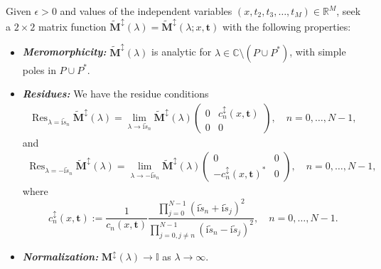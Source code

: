 \documentclass[12pt]{amsart}
\numberwithin{equation}{section}
\newcommand{\ii}{\mathrm{i}}
\newcommand{\SP}{\lambda}
\def\eq{\begin{equation}}
\def\endeq{\end{equation}}
\begin{document}
\begin{myrhp}
\label{rhp-meromorphic_renorm}
Given $\epsilon>0$ and values of the independent variables $(x,t_2,t_3,\dots,t_M)\in\mathbb{R}^M$, seek a $2\times 2$ matrix function $\widetilde{\mathbf{M}}^\updownarrow(\SP) =\widetilde{\mathbf{M}}^\updownarrow(\SP;x,\mathbf{t})$ with the following properties:
\begin{itemize}
\item[]\textit{\textbf{Meromorphicity:}} $\widetilde{\mathbf{M}}^\updownarrow(\SP) $ is 
analytic for $\SP\in\mathbb{C}\setminus (P\cup P^*)$, with simple poles 
in $P\cup P^*$.
\item[]\textit{\textbf{Residues:}}  
We have the residue conditions
\begin{equation}
\begin{split}
\mathop{\mathrm{Res}}_{\SP=\ii\widetilde{s}_n}\widetilde{\mathbf{M}}^\updownarrow(\SP)=\lim_{\SP\to \ii\widetilde{s}_n}\widetilde{\mathbf{M}}^\updownarrow(\SP) \begin{pmatrix} 0 & c^\updownarrow_n(x,\mathbf{t}) \\ 0 & 0 \end{pmatrix}, \quad n=0,\dots,N-1,
\label{eq:RHP-pole-C-plus-renorm}
\end{split}
\end{equation}
and
\begin{equation}
\begin{split}
\mathop{\mathrm{Res}}_{\SP=-\ii\widetilde{s}_n}\widetilde{\mathbf{M}}^\updownarrow(\SP)=\lim_{\SP\to-\ii\widetilde{s}_n}\widetilde{\mathbf{M}}^\updownarrow(\SP) \begin{pmatrix} 0 & 0 \\-c^\updownarrow_n(x,\mathbf{t})^* & 0 \end{pmatrix}, \quad n=0,\dots,N-1,
\end{split}
\label{eq:RHP-pole-C-minus-renorm}
\end{equation}
where
\eq
c^\updownarrow_n(x,\mathbf{t}):=\frac{1}{c_n(x,\mathbf{t})}\frac{\prod_{j=0}^{N-1}(\ii\widetilde{s}_n+\ii\widetilde{s}_j)^2}{\prod_{j=0,j\neq n}^{N-1}(\ii \widetilde{s}_n-\ii\widetilde{s}_j)^2},\quad n=0,\dots,N-1.
\label{eq:cn-updown}
\endeq
\item[]\textit{\textbf{Normalization:}} $\mathbf{M}^\updownarrow(\SP) \to\mathbb{I}$ as $\SP\to\infty$.
\end{itemize}
\label{rhp:M-sigma-renorm}
\end{myrhp}
\end{document}
